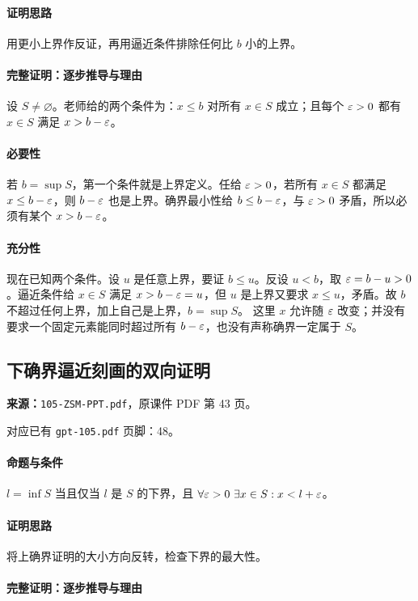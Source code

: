 \paragraph{证明思路}用更小上界作反证，再用逼近条件排除任何比 $b$ 小的上界。
\paragraph{完整证明：逐步推导与理由}

设 $S\ne\varnothing$。老师给的两个条件为：$x\le b$ 对所有 $x\in S$ 成立；且每个 $\varepsilon>0$ 都有 $x\in S$ 满足 $x>b-\varepsilon$。
\paragraph{必要性}若 $b=\sup S$，第一个条件就是上界定义。任给 $\varepsilon>0$，若所有 $x\in S$ 都满足 $x\le b-\varepsilon$，则 $b-\varepsilon$ 也是上界。确界最小性给 $b\le b-\varepsilon$，与 $\varepsilon>0$ 矛盾，所以必须有某个 $x>b-\varepsilon$。
\paragraph{充分性}现在已知两个条件。设 $u$ 是任意上界，要证 $b\le u$。反设 $u<b$，取 $\varepsilon=b-u>0$。逼近条件给 $x\in S$ 满足 $x>b-\varepsilon=u$，但 $u$ 是上界又要求 $x\le u$，矛盾。故 $b$ 不超过任何上界，加上自己是上界，$b=\sup S$。
这里 $x$ 允许随 $\varepsilon$ 改变；并没有要求一个固定元素能同时超过所有 $b-\varepsilon$，也没有声称确界一定属于 $S$。

\clearpage\subsection{下确界逼近刻画的双向证明}
\textbf{来源：}\texttt{105-ZSM-PPT.pdf}，原课件 PDF 第 43 页。\par
对应已有 \texttt{gpt-105.pdf} 页脚：48。\par
\paragraph{命题与条件}$l=\inf S$ 当且仅当 $l$ 是 $S$ 的下界，且 $\forall\varepsilon>0\ \exists x\in S:x<l+\varepsilon$。
\paragraph{证明思路}将上确界证明的大小方向反转，检查下界的最大性。
\paragraph{完整证明：逐步推导与理由}

